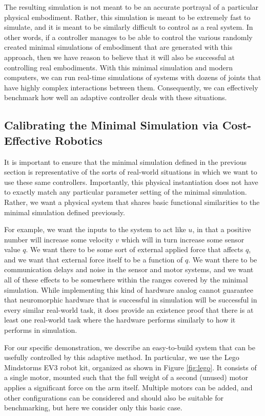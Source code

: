 \documentclass{frontiersSCNS} %
\begin{document}
The resulting simulation is not meant to be an accurate portrayal of a particular physical embodiment.
Rather, this simulation is meant to be extremely fast
to simulate, and it is meant to be similarly difficult to control as a real system.
In other words, if a controller manages to be able to control
the various randomly created minimal simulations of embodiment that are
generated with this approach, then we have reason to believe that it will also
be successful at controlling real embodiments.  With this minimal simulation and
modern computers, we can run real-time simulations of systems with dozens of joints that have
highly complex interactions between them.  Consequently, we can effectively
benchmark how well an adaptive
controller deals with these situations.

\subsection{Calibrating the Minimal Simulation via Cost-Effective Robotics}

It is important to ensure that the minimal simulation defined
in the previous section is representative of the sorts of real-world
situations in which we want to use these same controllers.  Importantly, 
this physical instantiation does not have to exactly match any particular
parameter setting of the minimal simulation.  Rather, we want a physical system
that shares basic functional similarities to the minimal simulation defined
previously.

For example, we want the inputs to the system to act like $u$, in that a
positive number will increase some velocity $v$ which will in turn increase some
sensor value $q$.  We want there to be some sort of external applied force that
affects $q$, and we want that external force itself to be a function of $q$.
We want there to be communication delays and noise in the sensor and motor
systems, and we want all of these effects to be somewhere within the
ranges covered by the minimal simulation.  While implementing this kind of
hardware analog cannot guarantee that neuromorphic hardware
that is successful in simulation will be successful in every similar
real-world task, it does provide an existence proof that there is at least
one real-world task where the hardware performs similarly to how it performs in simulation.

For our specific demonstration, we describe an easy-to-build system that can be usefully controlled
by this adaptive method.  In particular, we use the Lego Mindstorms EV3 robot kit,
organized as shown in Figure \ref{fig:lego}.  It consists of a single
motor, mounted such that the full weight of a second (unused) motor applies
a significant force on the arm itself.  Multiple motors can be
added, and other configurations can be considered and should also be suitable
for benchmarking, but here we consider only this basic case.
\end{document}
